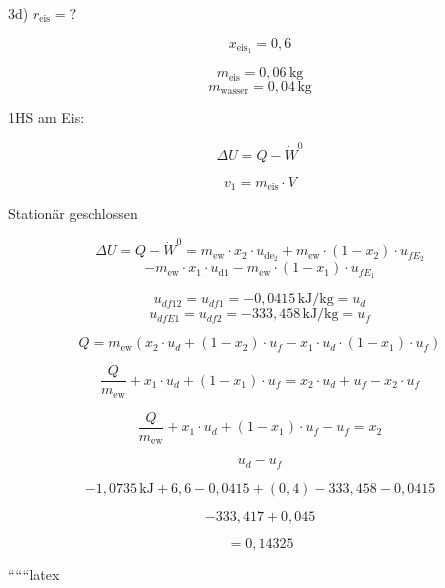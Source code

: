 3d) \(r_{\text{eis}} = ?\)

\[
x_{\text{eis}_1} = 0,6
\]

\[
m_{\text{eis}} = 0,06 \, \text{kg}
\]
\[
m_{\text{wasser}} = 0,04 \, \text{kg}
\]

1HS am Eis:

\[
\Delta U = Q - \dot{W}^0
\]

\[
v_1 = m_{\text{eis}} \cdot V
\]

Stationär geschlossen

\[
\Delta U = Q - \dot{W}^0 = m_{\text{ew}} \cdot x_2 \cdot u_{\text{de}_2} + m_{\text{ew}} \cdot (1 - x_2) \cdot u_{fE_2}
\]
\[
- m_{\text{ew}} \cdot x_1 \cdot u_{\text{d}1} - m_{\text{ew}} \cdot (1 - x_1) \cdot u_{fE_1}
\]

\[
u_{df12} = u_{df1} = -0,0415 \, \text{kJ/kg} = u_d
\]
\[
u_{dfE1} = u_{df2} = -333,458 \, \text{kJ/kg} = u_f
\]

\[
Q = m_{\text{ew}} \left( x_2 \cdot u_d + (1 - x_2) \cdot u_f - x_1 \cdot u_d \cdot (1 - x_1) \cdot u_f \right)
\]

\[
\frac{Q}{m_{\text{ew}}} + x_1 \cdot u_d + (1 - x_1) \cdot u_f = x_2 \cdot u_d + u_f - x_2 \cdot u_f
\]

\[
\frac{Q}{m_{\text{ew}}} + x_1 \cdot u_d + (1 - x_1) \cdot u_f - u_f = x_2
\]

\[
u_d - u_f
\]

\[
-1,0735 \, \text{kJ} + 6,6 - 0,0415 + (0,4) - 333,458 - 0,0415
\]

\[
-333,417 + 0,045
\]

\[
= 0,14325
\]

``````latex